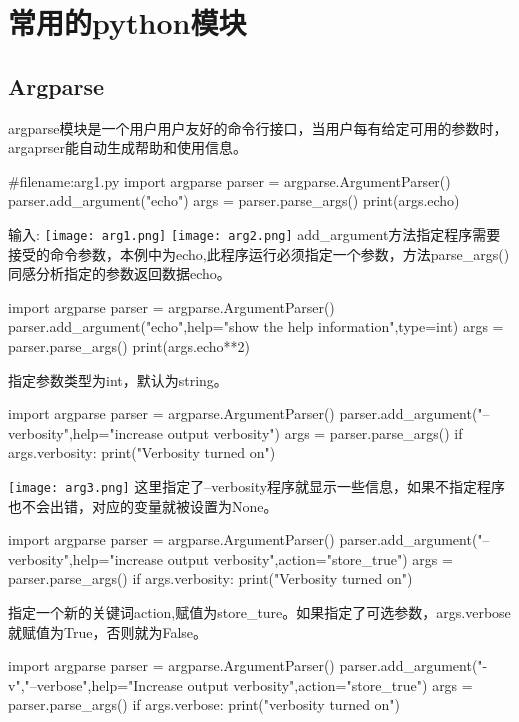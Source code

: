\chapter{常用的python模块}
\section{Argparse}
argparse模块是一个用户用户友好的命令行接口，当用户每有给定可用的参数时，argaprser能自动生成帮助和使用信息。
\begin{python}
#filename:arg1.py
import argparse
parser = argparse.ArgumentParser()
parser.add_argument("echo")
args = parser.parse_args()
print(args.echo)
\end{python}
输入:\newline
\texttt{[image: arg1.png]}\newline
\texttt{[image: arg2.png]}\newline
add\_argument方法指定程序需要接受的命令参数，本例中为echo,此程序运行必须指定一个参数，方法parse\_args()同感分析指定的参数返回数据echo。
\begin{python}
import argparse
parser = argparse.ArgumentParser()
parser.add_argument("echo",help="show the help information",type=int)
args = parser.parse_args()
print(args.echo**2)
\end{python}
指定参数类型为int，默认为string。
\begin{python}
import argparse
parser = argparse.ArgumentParser()
parser.add_argument("--verbosity",help="increase output verbosity")
args = parser.parse_args()
if args.verbosity:
    print("Verbosity turned on")
\end{python}
\texttt{[image: arg3.png]}\newline
这里指定了--verbosity程序就显示一些信息，如果不指定程序也不会出错，对应的变量就被设置为None。
\begin{python}
import argparse
parser = argparse.ArgumentParser()
parser.add_argument("--verbosity",help="increase output verbosity",action="store_true")
args = parser.parse_args()
if args.verbosity:
    print("Verbosity turned on")
\end{python}
指定一个新的关键词action,赋值为store\_ture。如果指定了可选参数，args.verbose就赋值为True，否则就为False。
\begin{python}
import argparse
parser = argparse.ArgumentParser()
parser.add_argument("-v","--verbose",help="Increase output verbosity",action="store_true")
args = parser.parse_args()
if args.verbose:
    print("verbosity turned on")
\end{python}
